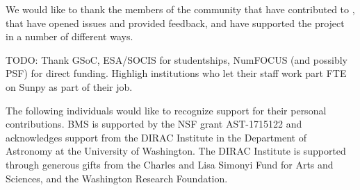 \acknowledgments

We would like to thank the members of the community that have
contributed to \sunpy, that have opened issues and provided feedback, and
have supported the project in a number of different ways.

TODO: Thank GSoC, ESA/SOCIS for studentships, NumFOCUS (and possibly
PSF) for direct funding. Highligh institutions who let their staff work part
FTE on Sunpy as part of their job.

The following individuals would like to recognize support for their personal
contributions. BMS is supported by the NSF grant AST-1715122 and
acknowledges support from the DIRAC Institute in the Department of Astronomy
at the University of Washington. The DIRAC Institute is supported through
generous gifts from the Charles and Lisa Simonyi Fund for Arts and Sciences,
and the Washington Research Foundation.
